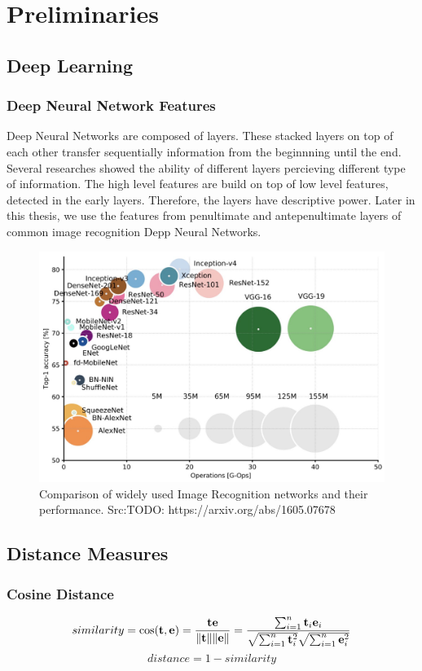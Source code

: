 

\chapter{Preliminaries}

\section{Deep Learning}

\subsection{Deep Neural Network Features}

Deep Neural Networks are composed of layers. These stacked layers on top of each other transfer sequentially information from the beginnning until the end. Several researches showed the ability of different layers percieving different type of information. The high level features are build on top of low level features, detected in the early layers. Therefore, the layers have descriptive power. Later in this thesis, we use the features from penultimate and antepenultimate layers of common image recognition Depp Neural Networks.

\begin{figure}
	\includegraphics[width=0.8\linewidth]{img/network-comparison.jpeg}
	\caption{Comparison of widely used Image Recognition networks and their performance. Src:TODO: https://arxiv.org/abs/1605.07678}
	\label{fig:camera-setup}
\end{figure}


\section{Distance Measures}

\subsection{Cosine Distance}
\begin{equation}
similarity = \cos ({\bf t},{\bf e})= {{\bf t} {\bf e} \over \|{\bf t}\| \|{\bf e}\|} = \frac{ \sum_{i=1}^{n}{{\bf t}_i{\bf e}_i} }{ \sqrt{\sum_{i=1}^{n}{{\bf t}_i^2}} \sqrt{\sum_{i=1}^{n}{{\bf e}_i^2}} }
\end{equation}
\begin{equation}
    distance = 1 - similarity
\end{equation}

